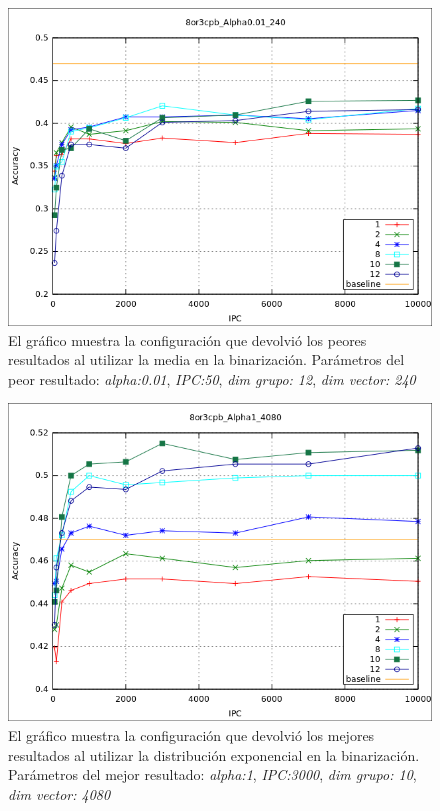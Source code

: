 			\begin{figure}[htbp]
				\centering
				\includegraphics[scale=0.6]{img/resultados/sinteticas/worst_media_8or3cpb_Alpha0,01_240.png}
				\caption[Sintéticas media bajo resultado]{El gráfico muestra la configuración que devolvió los peores resultados al utilizar la media en la binarización. Parámetros del peor resultado: \textit{alpha:0.01}, \textit{IPC:50}, \textit{dim grupo: 12}, \textit{dim vector: 240}}
				\label{fig: Sinteticas-media-peor}
			\end{figure}
			
			\begin{figure}[htbp]
				\centering
				\includegraphics[scale=0.6]{img/resultados/sinteticas/best_expon_8or3cpb_Alpha1_4080.png}
				\caption[Sintéticas exponencial mejor resultado]{El gráfico muestra la configuración que devolvió los mejores resultados al utilizar la distribución exponencial en la binarización. Parámetros del mejor resultado: \textit{alpha:1}, \textit{IPC:3000}, \textit{dim grupo: 10}, \textit{dim vector: 4080}}
				\label{fig: Sinteticas-expon-mejor}
			\end{figure}
	
